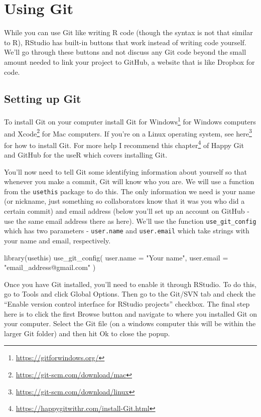 \documentclass[
]{krantz}
\makeatletter
\newenvironment{Shaded}{\begin{snugshade}}{\end{snugshade}}
\newcommand{\AttributeTok}[1]{\textcolor[rgb]{0.61,0.61,0.61}{#1}}
\newcommand{\FunctionTok}[1]{\textcolor[rgb]{0,0,0}{#1}}
\newcommand{\NormalTok}[1]{#1}
\newcommand{\StringTok}[1]{\textcolor[rgb]{0.5,0.5,0.5}{#1}}
\renewcommand{\href}[2]{#2\footnote{\url{#1}}}
\newenvironment{kframe}{%
\medskip{}
\setlength{\fboxsep}{.8em}
 \def\at@end@of@kframe{}%
 \ifinner\ifhmode%
  \def\at@end@of@kframe{\end{minipage}}%
  \begin{minipage}{\columnwidth}%
 \fi\fi%
 \def\FrameCommand##1{\hskip\@totalleftmargin \hskip-\fboxsep
 \colorbox{shadecolor}{##1}\hskip-\fboxsep
     \hskip-\linewidth \hskip-\@totalleftmargin \hskip\columnwidth}%
 \MakeFramed {\advance\hsize-\width
   \@totalleftmargin\z@ \linewidth\hsize
   \@setminipage}}%
 {\par\unskip\endMakeFramed%
 \at@end@of@kframe}
\renewenvironment{Shaded}{\begin{kframe}}{\end{kframe}}
\makeatother
\begin{document}
\hypertarget{using-git}{%
\section{Using Git}\label{using-git}}

While you can use Git like writing R code (though the syntax
is not that similar to R), RStudio has built-in buttons that
work instead of writing code yourself. We'll go through
these buttons and not discuss any Git code beyond the small
amount needed to link your project to GitHub, a website that
is like Dropbox for code.

\hypertarget{setting-up-git}{%
\subsection{Setting up Git}\label{setting-up-git}}

To install Git on your computer install
\href{https://gitforwindows.org/}{Git for Windows} for
Windows computers and
\href{https://git-scm.com/download/mac}{Xcode} for Mac
computers. If you're on a Linux operating system, see
\href{https://git-scm.com/download/linux}{here} for how to
install Git. For more help I recommend
\href{https://happygitwithr.com/install-Git.html}{this
chapter} of Happy Git and GitHub for the useR which covers
installing Git.

You'll now need to tell Git some identifying information
about yourself so that whenever you make a commit, Git will
know who you are. We will use a function from the
\texttt{usethis} package to do this. The only information we
need is your name (or nickname, just something so
collaborators know that it was you who did a certain commit)
and email address (below you'll set up an account on GitHub
- use the same email address there as here). We'll use the
function \texttt{use\_git\_config} which has two parameters
- \texttt{user.name} and \texttt{user.email} which take
strings with your name and email, respectively.

\begin{Shaded}
\begin{Highlighting}[]
\FunctionTok{library}\NormalTok{(usethis)}
\FunctionTok{use\_git\_config}\NormalTok{(}
  \AttributeTok{user.name =} \StringTok{"Your name"}\NormalTok{,}
  \AttributeTok{user.email =} \StringTok{"email\_address@gmail.com"}
\NormalTok{)}
\end{Highlighting}
\end{Shaded}

Once you have Git installed, you'll need to enable it
through RStudio. To do this, go to Tools and click Global
Options. Then go to the Git/SVN tab and check the ``Enable
version control interface for RStudio projects'' checkbox.
The final step here is to click the first Browse button and
navigate to where you installed Git on your computer. Select
the Git file (on a windows computer this will be within the
larger Git folder) and then hit Ok to close the popup.
\end{document}
